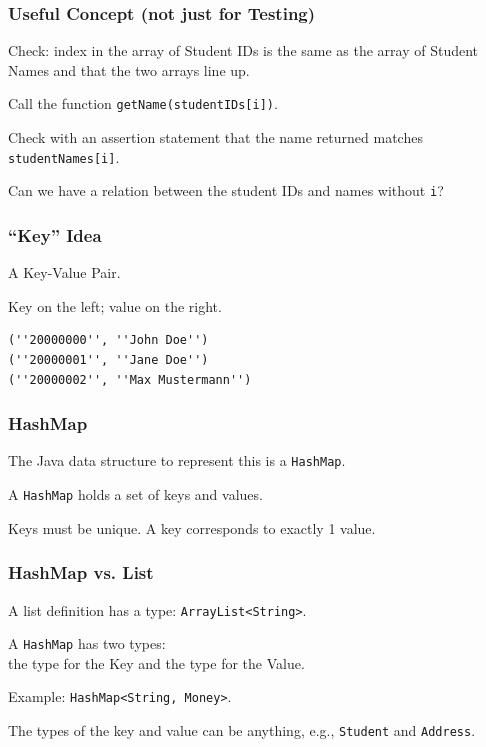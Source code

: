 \begin{frame}
\frametitle{Useful Concept (not just for Testing)}
\begin{changemargin}{1cm}

Check: index in the array of Student IDs is the same as the array of Student Names and that the two arrays line up. 

Call the function \texttt{getName(studentIDs[i])}.

Check with an assertion statement that the name returned matches \texttt{studentNames[i]}. 

Can we have a relation between the student IDs and names without \texttt{i}?


\end{changemargin}
\end{frame}

\begin{frame}[fragile]
\frametitle{``Key'' Idea}
\begin{changemargin}{1cm}

A \alert{Key-Value Pair}. 

Key on the left; value on the right.


\begin{verbatim}
(''20000000'', ''John Doe'')
(''20000001'', ''Jane Doe'')
(''20000002'', ''Max Mustermann'')
\end{verbatim}

\end{changemargin}
\end{frame}


\begin{frame}
\frametitle{HashMap}
\begin{changemargin}{1cm}

The Java data structure to represent this is a \texttt{HashMap}.

A \texttt{HashMap} holds a set of keys and values.

Keys must be unique. A key corresponds to exactly 1 value.


\end{changemargin}
\end{frame}


\begin{frame}
\frametitle{HashMap vs. List}
\begin{changemargin}{1cm}

A list definition has a type: \texttt{ArrayList<String>}. 

A \texttt{HashMap} has two types:\\
\quad the type for the Key and the type for the Value. 

Example: \texttt{HashMap<String, Money>}. 

The types of the key and value can be anything, e.g., \texttt{Student} and \texttt{Address}.



\end{changemargin}
\end{frame}


